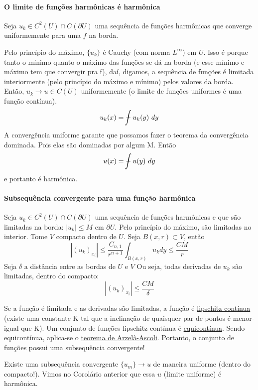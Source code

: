 \documentclass[11pt]{article}
\newcommand{\p}{\partial}
\def\Xint#1{\mathchoice
	{\XXint\displaystyle\textstyle{#1}}%
	{\XXint\textstyle\scriptstyle{#1}}%
	{\XXint\scriptstyle\scriptscriptstyle{#1}}%
	{\XXint\scriptscriptstyle\scriptscriptstyle{#1}}%
	\!\int}
\def\XXint#1#2#3{{\setbox0=\hbox{$#1{#2#3}{\int}$ }
		\vcenter{\hbox{$#2#3$ }}\kern-.6\wd0}}
\def\dashint{\Xint-}
\begin{document}
\paragraph{O limite de funções harmônicas é harmônica}

Seja \( u_k \in C^2(U) \cap C(\p U) \) uma sequência de funções harmônicas que converge uniformemente para uma \( f \) na borda. 

Pelo princípio do máximo, \( \{u_k\} \) é Cauchy (com norma \( L^\infty \)) em \( U \). Isso é porque tanto o mínimo quanto o máximo das funções se dá na borda (e esse mínimo e máximo tem que convergir pra f), daí, digamos, a sequência de funções é limitada interiormente (pelo princípio do máximo e mínimo) pelos valores da borda. Então, \( u_k \rightarrow u \in C(U) \) uniformemente (o limite de funções uniformes é uma função contínua). \[ u_k(x) = \dashint u_k(y)\ dy \] A convergência uniforme garante que possamos fazer o teorema da convergência dominada. Pois elas são dominadas por algum M. Então \[ u(x) = \dashint u(y)\ dy \] e portanto é harmônica.

\paragraph{Subsequência convergente para uma função harmônica}

Seja \( u_k \in C^2(U) \cap C(\p U) \) uma sequência de funções harmônicas e que são limitadas na borda: \( |u_k|\leq M  \) em \( \p U \). Pelo princípio do máximo, são limitadas no interior. Tome \( V \) compacto dentro de \( U \). Seja \( B(x,r)\subset V \), então \[  | (u_k)_{x_i} | \leq \frac{C_{n,1}}{r^{n+1}} \int_{B(x,r)} u_k dy \leq \frac{CM}{r}  \] Seja \( \delta \) a distância entre as bordas de \( U \) e \( V \)
Ou seja, todas derivadas de \( u_k \) são limitadas, dentro do compacto:
\[| (u_k)_{x_i} | \leq \frac{CM}{\delta} \]


Se a função é limitada e as derivadas são limitadas, a função é \href{https://en.wikipedia.org/wiki/Lipschitz_continuity}{lipschitz contínua} (existe uma constante K tal que a inclinação de quaisquer par de pontos é menor-igual que K). Um conjunto de funções lipschitz contínua é \href{https://en.wikipedia.org/wiki/Equicontinuity}{equicontínua}. Sendo equicontínua, aplica-se o \href{https://en.wikipedia.org/wiki/Arzel\%C3\%A0\%E2\%80\%93Ascoli_theorem}{teorema de Arzelà-Ascoli}. Portanto, o conjunto de funções possui uma subsequência convergente! 

Existe uma subsequência convergente \( \{ u_m \} \rightarrow u \) de maneira uniforme (dentro do compacto!). Vimos no Corolário anterior que essa \( u \) (limite uniforme) é harmônica.
\end{document}
